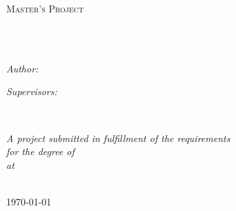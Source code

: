 \documentclass[
11pt, %
english, %
singlespacing, %
headsepline, %
]{MastersDoctoralThesis} %
\author{Matthew \textsc{Tiger}}
\begin{document}
\frontmatter %

\pagestyle{plain} %


\begin{titlepage}
\begin{center}

\vspace*{.06\textheight}
{\scshape\LARGE \univname\par}\vspace{1.5cm} %
\textsc{\Large Master's Project}\\[0.5cm] %

\HRule \\[0.4cm] %
{\huge \bfseries \ttitle\par}\vspace{0.4cm} %
\HRule \\[1.5cm] %

\begin{minipage}[t]{0.4\textwidth}
\begin{flushleft} \large
\emph{Author:}\\
{\authorname} %
\end{flushleft}
\end{minipage}
\begin{minipage}[t]{0.4\textwidth}
\begin{flushright} \large
\emph{Supervisors:} \\
{\supname} %
\end{flushright}\end{minipage}\\[3cm]

\vfill

\large \textit{A project submitted in fulfillment of the requirements\\ for the degree of \degreename}\\[0.3cm] %
\textit{at}\\[0.4cm]
\univname\\[2cm] %

\vfill

{\large \today}\\[4cm] %

\vfill
\end{center}
\end{titlepage}
\end{document}
